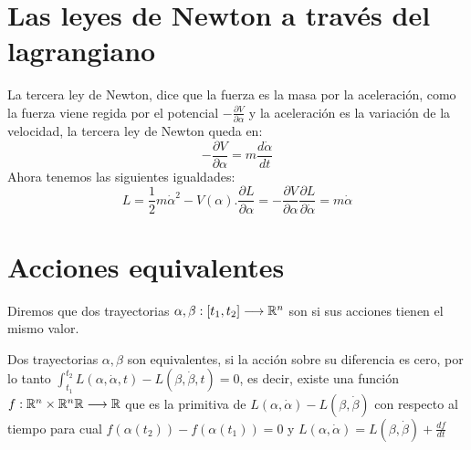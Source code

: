 \section{Las leyes de Newton a través del lagrangiano}
La tercera ley de Newton, dice que la fuerza es la masa por la aceleración, como la fuerza viene regida por el potencial $-\frac{\partial V}{\partial\alpha}$ y la aceleración es la variación de la velocidad, la tercera ley de Newton queda en:
\begin{equation*}
    -\frac{\partial V}{\partial\alpha} = m\frac{d\dot{\alpha}}{dt}
\end{equation*}
Ahora tenemos las siguientes igualdades:
\begin{subequations}
    \begin{equation*}
        L=\frac{1}{2}m\dot{\alpha}^2-V(\alpha).
    \end{equation*}
    \begin{equation*}
        \frac{\partial L}{\partial \alpha}=-\frac{\partial V}{\partial \alpha}
    \end{equation*}
    \begin{equation*}
        \frac{\partial L}{\partial\dot{\alpha}}=m\dot{\alpha}
    \end{equation*}
\end{subequations}


\section{Acciones equivalentes}
\begin{definition}
    Diremos que dos trayectorias $\alpha,\beta:[t_1, t_2]\longrightarrow \mathbb{R}^n$ son  si sus acciones tienen el mismo valor.
\end{definition}

Dos trayectorias $\alpha, \beta$ son equivalentes, si la acción sobre su diferencia es cero, por lo tanto $\int_{t_1}^{t_2} L(\alpha, \dot{\alpha}, t)-L(\beta, \dot{\beta}, t)=0$, es decir, existe una función $f:\mathbb{R}^n\times\mathbb{R}^n\mathbb{R}\longrightarrow \mathbb{R}$ que es la primitiva de $L(\alpha, \dot{\alpha})-L(\beta, \dot{\beta})$ con respecto al tiempo para cual $f(\alpha(t_2))-f(\alpha(t_1))=0$ y $L(\alpha, \dot{\alpha})=L(\beta, \dot{\beta})+\frac{df}{dt}$
